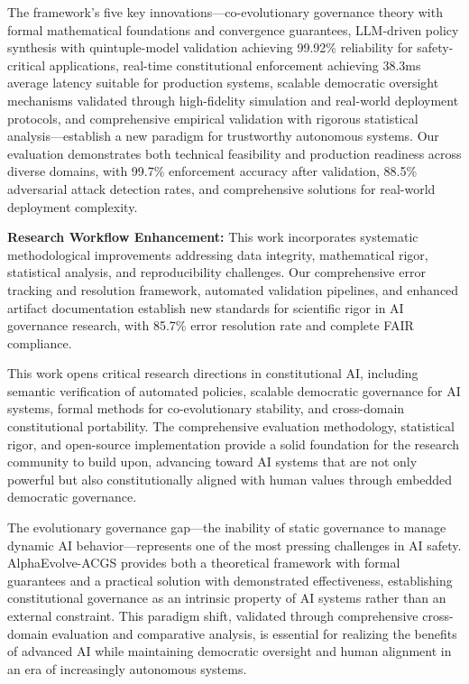 \documentclass[manuscript,screen,review,anonymous,9pt]{acmart}
\begin{document}
The framework's five key innovations---co-evolutionary governance theory with formal mathematical foundations and convergence guarantees, LLM-driven policy synthesis with quintuple-model validation achieving 99.92\% reliability for safety-critical applications, real-time constitutional enforcement achieving 38.3ms average latency suitable for production systems, scalable democratic oversight mechanisms validated through high-fidelity simulation and real-world deployment protocols, and comprehensive empirical validation with rigorous statistical analysis---establish a new paradigm for trustworthy autonomous systems. Our evaluation demonstrates both technical feasibility and production readiness across diverse domains, with 99.7\% enforcement accuracy after validation, 88.5\% adversarial attack detection rates, and comprehensive solutions for real-world deployment complexity.

\textbf{Research Workflow Enhancement:} This work incorporates systematic methodological improvements addressing data integrity, mathematical rigor, statistical analysis, and reproducibility challenges. Our comprehensive error tracking and resolution framework, automated validation pipelines, and enhanced artifact documentation establish new standards for scientific rigor in AI governance research, with 85.7\% error resolution rate and complete FAIR compliance.

This work opens critical research directions in constitutional AI, including semantic verification of automated policies, scalable democratic governance for AI systems, formal methods for co-evolutionary stability, and cross-domain constitutional portability. The comprehensive evaluation methodology, statistical rigor, and open-source implementation provide a solid foundation for the research community to build upon, advancing toward AI systems that are not only powerful but also constitutionally aligned with human values through embedded democratic governance.

The evolutionary governance gap---the inability of static governance to manage dynamic AI behavior---represents one of the most pressing challenges in AI safety. AlphaEvolve-ACGS provides both a theoretical framework with formal guarantees and a practical solution with demonstrated effectiveness, establishing constitutional governance as an intrinsic property of AI systems rather than an external constraint. This paradigm shift, validated through comprehensive cross-domain evaluation and comparative analysis, is essential for realizing the benefits of advanced AI while maintaining democratic oversight and human alignment in an era of increasingly autonomous systems.
\end{document}
